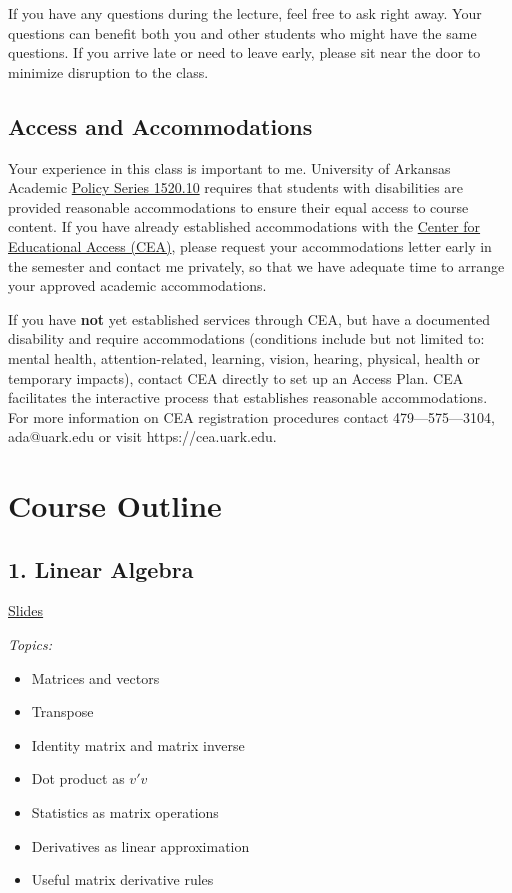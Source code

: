 \documentclass[12pt]{article}
\begin{document}
If you have any questions during the lecture, feel free to ask right away. Your questions can benefit both you and other students who might have the same questions. If you arrive late or need to leave early, please sit near the door to minimize disruption to the class.

\subsection*{Access and Accommodations}

Your experience in this class is important to me. University of Arkansas Academic \href{https://policies.uark.edu/academic/152010.php}{Policy Series 1520.10} requires that students with disabilities are provided reasonable accommodations to ensure their equal access to course content. If you have already established accommodations with the \href{https://cea.uark.edu}{Center for Educational Access (CEA)}, please request your accommodations letter early in the semester and contact me privately, so that we have adequate time to arrange your approved academic accommodations.

If you have \textbf{not} yet established services through CEA, but have a documented disability and require accommodations (conditions include but not limited to: mental health, attention-related, learning, vision, hearing, physical, health  or temporary impacts), contact CEA directly to set up an Access Plan. CEA facilitates the interactive process that establishes reasonable accommodations.  For more information on CEA registration procedures contact 479—575—3104, ada@uark.edu or visit https://cea.uark.edu.




\newpage
\section*{Course Outline}

\subsection*{1. Linear Algebra}

\href{https://nbviewer.org/github/kylebutts/UARK_5753/blob/main/01-Linear_Algebra/01-Linear_Algebra.pdf}{Slides}

\noindent\emph{Topics:}

\begin{itemize}
  \item Matrices and vectors
  \item Transpose
  \item Identity matrix and matrix inverse
  \item Dot product as $v' v$
  \item Statistics as matrix operations
  \item Derivatives as linear approximation
  \item Useful matrix derivative rules
\end{itemize}
\end{document}
